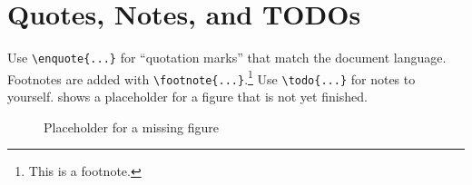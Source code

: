 \section{Quotes, Notes, and TODOs}\label{sec:latex:misc}

Use \verb|\enquote{...}| for \enquote{quotation marks} that match the document language.
Footnotes are added with \verb|\footnote{...}|.\footnote{This is a footnote.}
Use \verb|\todo{...}| for notes to yourself.
 shows a placeholder for a figure that is not yet finished.

\begin{figure}[htbp]
  \centering
  \caption{Placeholder for a missing figure}
  \label{fig:latex:missing}
\end{figure}
